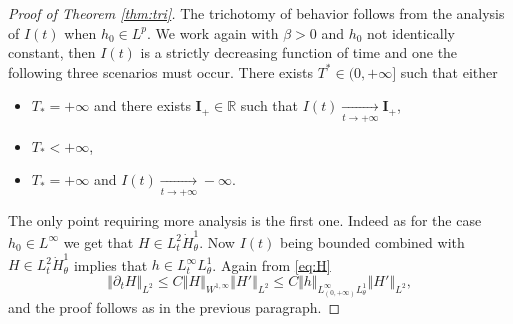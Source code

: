 \documentclass[10pt]{amsart}
\theoremstyle{plain}
\theoremstyle{definition}
\newcommand{\bfI}{{\mathbf I}}
\begin{document}
\begin{proof}[Proof of Theorem \ref{thm:tri}]
The trichotomy of behavior follows from the analysis of $I(t)$ when $h_0\in L^p$. We work again with $\beta>0$ and $h_0$ not identically constant, then $I(t)$ is a strictly decreasing function of time and one the following three scenarios must occur. There exists $T^*\in (0,+\infty]$ such that either
\begin{itemize}
\item $T_*=+\infty$ and there exists $\bfI_{+}\in \mathbb{R}$ such that $I(t)\underset{t\to +\infty}{\to}\bfI_{+}$,
\item $T_*<+\infty$,
\item $T_*=+\infty$ and $I(t)\underset{t\to +\infty}{\to}-\infty$.
\end{itemize}
The only point requiring more analysis is the first one. Indeed as for the case $h_0\in L^\infty$ we get that $H\in L^2_t\dot{H}^1_\theta$. Now $I(t)$ being bounded combined with $H\in L^2_t\dot{H}^1_\theta$ implies that $h\in L^\infty_t L^1_\theta$. Again from \eqref{eq:H}
\[
\left\Vert \partial_t H \right\Vert_{L^2} \leq C\left\Vert H\right\Vert_{W^{1,\infty}}\left\Vert H'\right\Vert_{L^2}\leq C \Vert h\Vert_{L^\infty_{(0,+\infty)}L^1_\theta}\left\Vert H'\right\Vert_{L^2},
\]
and the proof follows as in the previous paragraph.
\end{proof}

\end{document}
